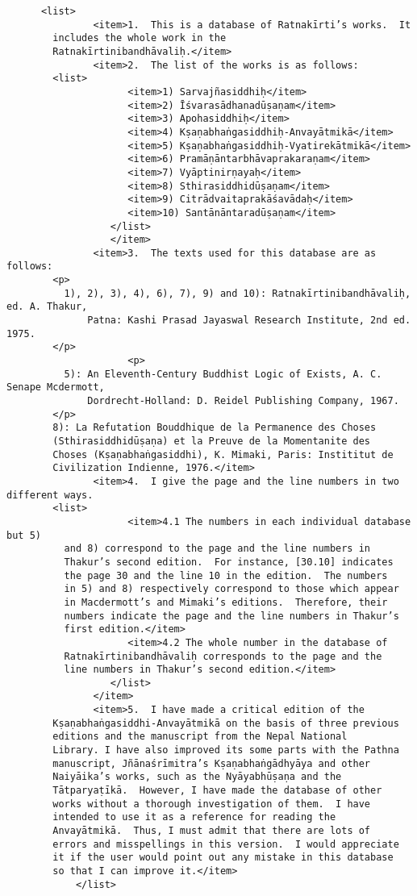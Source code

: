 \documentclass[article,12pt,a4paper]{memoir}%
\begin{document}
\begin{verbatim}
	  <list>
               <item>1.  This is a database of Ratnakīrti’s works.  It
	    includes the whole work in the
	    Ratnakīrtinibandhāvaliḥ.</item>
               <item>2.  The list of the works is as follows:
	    <list>
                     <item>1) Sarvajñasiddhiḥ</item>
                     <item>2) Īśvarasādhanadūṣaṇam</item>
                     <item>3) Apohasiddhiḥ</item>
                     <item>4) Kṣaṇabhaṅgasiddhiḥ-Anvayātmikā</item>
                     <item>5) Kṣaṇabhaṅgasiddhiḥ-Vyatirekātmikā</item>
                     <item>6) Pramāṇāntarbhāvaprakaraṇam</item>
                     <item>7) Vyāptinirṇayaḥ</item>
                     <item>8) Sthirasiddhidūṣaṇam</item>
                     <item>9) Citrādvaitaprakāśavādaḥ</item>
                     <item>10) Santānāntaradūṣaṇam</item>
                  </list>
	              </item>
               <item>3.  The texts used for this database are as follows:
	    <p>
	      1), 2), 3), 4), 6), 7), 9) and 10): Ratnakīrtinibandhāvaliḥ, ed. A. Thakur, 
              Patna: Kashi Prasad Jayaswal Research Institute, 2nd ed. 1975.
	    </p>
	                 <p>
	      5): An Eleventh-Century Buddhist Logic of Exists, A. C. Senape Mcdermott, 
              Dordrecht-Holland: D. Reidel Publishing Company, 1967.
	    </p>
	    8): La Refutation Bouddhique de la Permanence des Choses
	    (Sthirasiddhidūṣaṇa) et la Preuve de la Momentanite des
	    Choses (Kṣaṇabhaṅgasiddhi), K. Mimaki, Paris: Instititut de
	    Civilization Indienne, 1976.</item>
               <item>4.  I give the page and the line numbers in two different ways.
	    <list>
                     <item>4.1 The numbers in each individual database but 5)
	      and 8) correspond to the page and the line numbers in
	      Thakur’s second edition.  For instance, [30.10] indicates
	      the page 30 and the line 10 in the edition.  The numbers
	      in 5) and 8) respectively correspond to those which appear
	      in Macdermott’s and Mimaki’s editions.  Therefore, their
	      numbers indicate the page and the line numbers in Thakur’s
	      first edition.</item>
                     <item>4.2 The whole number in the database of
	      Ratnakīrtinibandhāvaliḥ corresponds to the page and the
	      line numbers in Thakur’s second edition.</item>
                  </list>
               </item>
               <item>5.  I have made a critical edition of the
	    Kṣaṇabhaṅgasiddhi-Anvayātmikā on the basis of three previous
	    editions and the manuscript from the Nepal National
	    Library. I have also improved its some parts with the Pathna
	    manuscript, Jñānaśrīmitra’s Kṣaṇabhaṅgādhyāya and other
	    Naiyāika’s works, such as the Nyāyabhūṣaṇa and the
	    Tātparyaṭīkā.  However, I have made the database of other
	    works without a thorough investigation of them.  I have
	    intended to use it as a reference for reading the
	    Anvayātmikā.  Thus, I must admit that there are lots of
	    errors and misspellings in this version.  I would appreciate
	    it if the user would point out any mistake in this database
	    so that I can improve it.</item>
            </list>


\end{verbatim}
\end{document}
